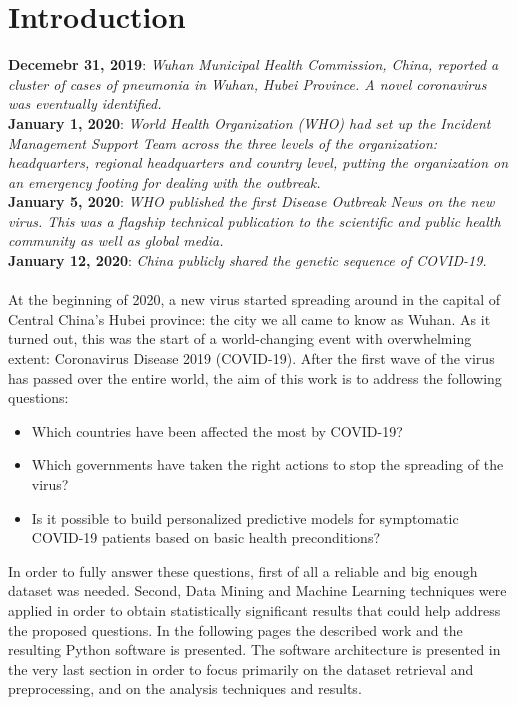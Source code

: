 \documentclass[11pt,a4paper]{article}
\begin{document}
\section{Introduction}
\textbf{Decemebr 31, 2019}: \textit{Wuhan Municipal Health Commission, China,
reported a cluster of cases of pneumonia in Wuhan, Hubei Province. A novel
coronavirus was eventually identified.}\\
\textbf{January 1, 2020}: \textit{World Health Organization (WHO) had set up the
Incident Management Support Team across the three levels of the organization:
headquarters, regional headquarters and country level, putting the organization
on an emergency footing for dealing with the outbreak.}\\
\textbf{January 5, 2020}: \textit{WHO published the first Disease Outbreak News
on the new virus. This was a flagship technical publication to the scientific
and public health community as well as global media.}\\
\textbf{January 12, 2020}: \textit{China publicly shared the genetic sequence of
COVID-19.}\\
\\
At the beginning of 2020, a new virus started spreading around in the capital of
Central China's Hubei province: the city we all came to know as Wuhan. As it
turned out, this was the start of a world-changing event with overwhelming
extent: Coronavirus Disease 2019 (COVID-19). After the first wave of the virus
has passed over the entire world, the aim of this work is to address the
following questions:
\begin{itemize}
	\item Which countries have been affected the most by COVID-19?
	\item Which governments have taken the right actions to stop the
		spreading of the virus?
	\item Is it possible to build personalized predictive models for
		symptomatic COVID-19 patients based on basic health preconditions?
\end{itemize}
In order to fully answer these questions, first of all a reliable and big enough
dataset was needed. Second, Data Mining and Machine Learning techniques were
applied in order to obtain statistically significant results that could help
address the proposed questions. In the following pages the described work and
the resulting Python software is presented. The software architecture is
presented in the very last section in order to focus primarily on the dataset
retrieval and preprocessing, and on the analysis techniques and results.
\end{document}
